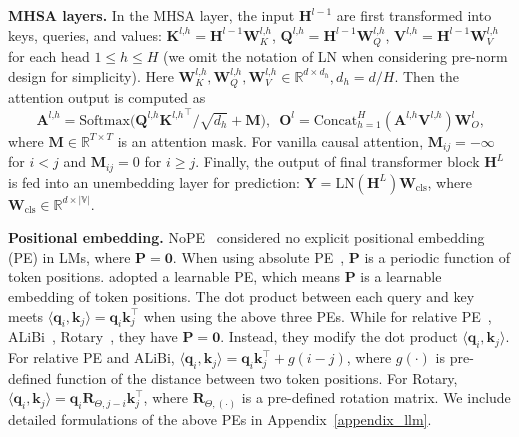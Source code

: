 \documentclass{article} \usepackage{iclr2025_conference,times}
\begin{document}
\textbf{MHSA layers.} In the MHSA layer, the input $\boldsymbol{H}^{l-1}$ are first transformed into keys, queries, and values: $\boldsymbol{K}^{l\textrm{,}h}=\boldsymbol{H}^{l-1}\boldsymbol{W}_{K}^{l\textrm{,}h}$, $\boldsymbol{Q}^{l\textrm{,}h}=\boldsymbol{H}^{l-1}\boldsymbol{W}_{Q}^{l\textrm{,}h}$, $\boldsymbol{V}^{l\textrm{,}h}=\boldsymbol{H}^{l-1}\boldsymbol{W}_{V}^{l\textrm{,}h}$ for each head $1\leq h\leq H$ (we omit the notation of LN when considering pre-norm design for simplicity). Here $\boldsymbol{W}_{K}^{l\textrm{,}h}, \boldsymbol{W}_{Q}^{l\textrm{,}h}, \boldsymbol{W}_{V}^{l\textrm{,}h} \in \mathbb{R}^{d\times d_h}\textrm{,}\,d_h=d/H$. Then the attention output is computed as
\begin{equation}
    \boldsymbol{A}^{l\textrm{,}h}= \textrm{Softmax}\big({\boldsymbol{Q}^{l\textrm{,}h}{\boldsymbol{K}^{l\textrm{,}h}}^\top}/{\sqrt{d_h}}+ \boldsymbol{M}\big)\textrm{,}\,\,\,\,
\boldsymbol{O}^l=\textrm{Concat}_{h=1}^H\left(\boldsymbol{A}^{l\textrm{,}h}\boldsymbol{V}^{l\textrm{,}h}\right)\boldsymbol{W}_{O}^l\textrm{,}
\end{equation}
where $\boldsymbol{M}\in \mathbb{R}^{T\times T}$ is an attention mask. For vanilla causal attention, $\boldsymbol{M}_{ij}=-\infty$ for $i<j$ and $\boldsymbol{M}_{ij}=0$ for $i\geq j$. Finally, the output of final transformer block $\boldsymbol{H}^{L}$ is fed into an unembedding layer for prediction: $\boldsymbol{Y}=\textrm{LN}(\boldsymbol{H}^{L})\boldsymbol{W}_{\textrm{cls}}$, where $\boldsymbol{W}_{\textrm{cls}}\in\mathbb{R}^{d\times |\mathbb{V}|}$.

\textbf{Positional embedding.} NoPE~\citep{kazemnejad2024impact} considered no explicit positional embedding (PE) in LMs, where $\boldsymbol{P}=\boldsymbol{0}$. When using absolute PE~\citep{vaswani2017attention}, $\boldsymbol{P}$ is a periodic function of token positions. \citet{devlin2019bert,Brown2020language} adopted a learnable PE, which means $\boldsymbol{P}$ is a learnable embedding of token positions. The dot product between each query and key meets $\langle\boldsymbol{q}_i\textrm{,}\, \boldsymbol{k}_j\rangle=\boldsymbol{q}_i \boldsymbol{k}_j^\top$ when using the above three PEs. While for relative PE~\citep{raffel2020exploring}, ALiBi~\citep{press2021train}, Rotary~\citep{su2024roformer}, they have  $\boldsymbol{P}=\boldsymbol{0}$. Instead, they modify the dot product $\langle\boldsymbol{q}_i\textrm{,}\, \boldsymbol{k}_j\rangle$. For relative PE and ALiBi, $\langle\boldsymbol{q}_i\textrm{,}\, \boldsymbol{k}_j\rangle=\boldsymbol{q}_i \boldsymbol{k}_j^\top + g(i-j)$, where $g(\cdot)$ is pre-defined function of the distance between two token positions. For Rotary, $\langle\boldsymbol{q}_i\textrm{,}\, \boldsymbol{k}_j\rangle=\boldsymbol{q}_i\boldsymbol{R}_{\Theta\textrm{,}\,j-i} \boldsymbol{k}_j^\top$, where $\boldsymbol{R}_{\Theta\textrm{,}\,(\cdot)}$ is a pre-defined rotation matrix. We include detailed formulations of the above PEs in Appendix~\ref{appendix_llm}.
\end{document}
